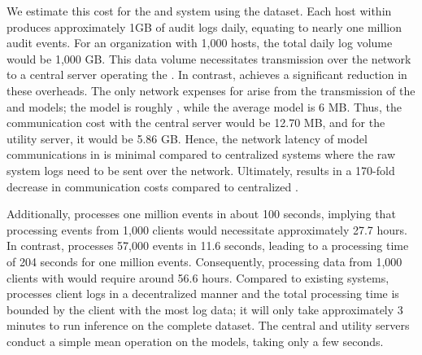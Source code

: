  We estimate this cost for the \flash and \kairos system using the \optc dataset. Each host within \optc produces approximately 1GB of audit logs daily, equating to nearly one million audit events. For an organization with 1,000 hosts, the total daily log volume would be 1,000 GB. This data volume necessitates transmission over the network to a central server operating the \pids. In contrast, \Sys achieves a significant reduction in these overheads. The only network expenses for \Sys arise from the transmission of the \gnnshort and \wordvec models; the \gnnshort model is roughly \modelsize, while the average \wordvec model is 6 MB. Thus, the communication cost with the central server would be 12.70 MB, and for the utility server, it would be 5.86 GB. Hence, the network latency of model communications in \Sys is minimal compared to centralized systems where the raw system logs need to be sent over the network. Ultimately, \Sys results in a 170-fold decrease in communication costs compared to centralized \pids.

 Additionally, \flash processes one million events in about 100 seconds, implying that processing events from 1,000 clients would necessitate approximately 27.7 hours. In contrast, \kairos processes 57,000 events in 11.6 seconds, leading to a processing time of 204 seconds for one million events. Consequently, processing data from 1,000 clients with \kairos would require around 56.6 hours. Compared to existing systems, \Sys processes client logs in a decentralized manner and the total processing time is bounded by the client with the most log data; it will only take approximately 3 minutes to run inference on the complete \optc dataset. The central and utility servers conduct a simple mean operation on the models, taking only a few seconds.


